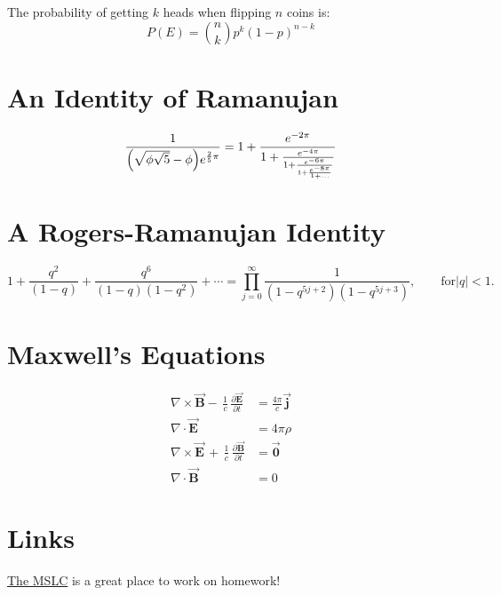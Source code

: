 \documentclass{ximera}
\begin{document}
The probability of getting $k$ heads when flipping $n$ coins is: 
\[P(E) = {n \choose k} p^k (1-p)^{ n-k} \]

\section{An Identity of Ramanujan}
\[ \frac{1}{\Bigl(\sqrt{\phi \sqrt{5}}-\phi\Bigr) e^{\frac25 \pi}} =
1+\frac{e^{-2\pi}} {1+\frac{e^{-4\pi}} {1+\frac{e^{-6\pi}}
{1+\frac{e^{-8\pi}} {1+\ldots} } } } \]

\section{A Rogers-Ramanujan Identity}
\[  1 +  \frac{q^2}{(1-q)}+\frac{q^6}{(1-q)(1-q^2)}+\cdots =
\prod_{j=0}^{\infty}\frac{1}{(1-q^{5j+2})(1-q^{5j+3})},
\quad\quad \text{for} |q|<1. \]

\section{Maxwell's Equations}
\[  \begin{aligned}
\nabla \times \vec{\mathbf{B}} -\, \frac1c\, \frac{\partial\vec{\mathbf{E}}}{\partial t} & = \frac{4\pi}{c}\vec{\mathbf{j}} \\
\nabla \cdot \vec{\mathbf{E}} & = 4 \pi \rho \\
\nabla \times \vec{\mathbf{E}}\, +\, \frac1c\, \frac{\partial\vec{\mathbf{B}}}{\partial t} & = \vec{\mathbf{0}} \\
\nabla \cdot \vec{\mathbf{B}} & = 0 
\end{aligned}\]

\section{Links}
\href{http://mslc.osu.edu}{
The MSLC} is a great place to work on homework!
\end{document}
